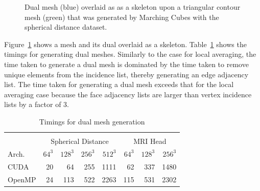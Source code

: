 \documentclass[10pt,journal,cspaper,compsoc]{IEEEtran}
\begin{document}
\begin{figure}[!tb]
\begin{center}
\setlength\fboxsep{0pt}
\end{center}
\caption{Dual mesh (blue) overlaid as as a skeleton upon a triangular contour mesh (green) that was generated by Marching Cubes with the spherical distance dataset.}
\label{fig:DualMeshSkeleton}
\end{figure}
Figure~\ref{fig:DualMeshSkeleton} shows a mesh and its dual overlaid as a skeleton. Table~\ref{tab:timingsdualmesh} shows the timings for generating dual meshes. Similarly to the case for local averaging, the time taken to generate a dual mesh is dominated by the time taken to remove unique elements from the incidence list, thereby generating an edge adjacency list. The time taken for generating a dual mesh exceeds that for the local averaging case because the face adjacency lists are larger than vertex incidence lists by a factor of 3. 

\begin{table}[tb!]
\begin{center}
\caption{Timings for dual mesh generation}
\label{tab:timingsdualmesh}
\begin{tabular}{l|r r r r|r r r}
\multicolumn{8}{c}{ } \\
 & \multicolumn{4}{|c|}{Spherical Distance} & \multicolumn{3}{|c}{MRI Head}\\
Arch. & $64^3$ & $128^3$ & $256^3$ & $512^3$ & $64^3$ & $128^3$ & $256^3$\\
\hline
CUDA & 20 & 64 & 255 & 1111 & 62 & 337 & 1480 \\
OpenMP & 24 & 113 & 522 & 2263 & 115 & 531 & 2302
\end{tabular}
\end{center}
\vspace{-0.6cm}
\end{table}
\end{document}
